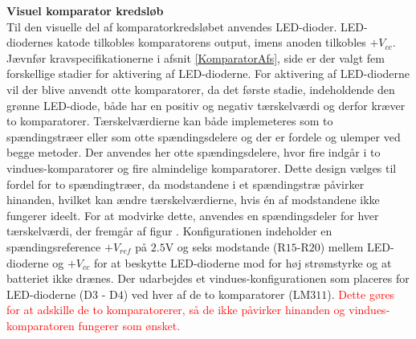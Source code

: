 \noindent\textbf{Visuel komparator kredsløb} \\
Til den visuelle del af komparatorkredsløbet anvendes LED-dioder. LED-diodernes katode tilkobles komparatorens output, imens anoden tilkobles $+V_{cc}$. Jævnfør kravspecifikationerne i afsnit \ref{KomparatorAfs}, side \pageref{KomparatorAfs} er der valgt fem forskellige stadier for aktivering af LED-dioderne. For aktivering af LED-dioderne vil der blive anvendt otte komparatorer, da det første stadie, indeholdende den grønne LED-diode, både har en positiv og negativ tærskelværdi og derfor kræver to komparatorer. Tærskelværdierne kan både implemeteres som to spændingstræer eller som otte spændingsdelere og der er fordele og ulemper ved begge metoder. Der anvendes her otte spændingsdelere, hvor fire indgår i to vindues-komparatorer og fire almindelige komparatorer. Dette design vælges til fordel for to spændingtræer, da modstandene i et spændingstræ påvirker hinanden, hvilket kan ændre tærskelværdierne, hvis én af modstandene ikke fungerer ideelt. For at modvirke dette, anvendes en spændingsdeler for hver tærskelværdi, der fremgår af figur . Konfigurationen indeholder en spændingsreference $+V_{ref}$ på $2.5$V og seks modstande (R$15$-R$20$) mellem LED-dioderne og $+V_{cc}$ for at beskytte LED-dioderne mod for høj strømstyrke og at batteriet ikke drænes. Der udarbejdes et vindues-konfigurationen som placeres for LED-dioderne (D$3$ - D$4$) ved hver af de to komparatorer (LM$311$). \textcolor{red}{Dette gøres for at adskille de to komparatorerer, så de ikke påvirker hinanden og vindues-komparatoren fungerer som ønsket.}  
